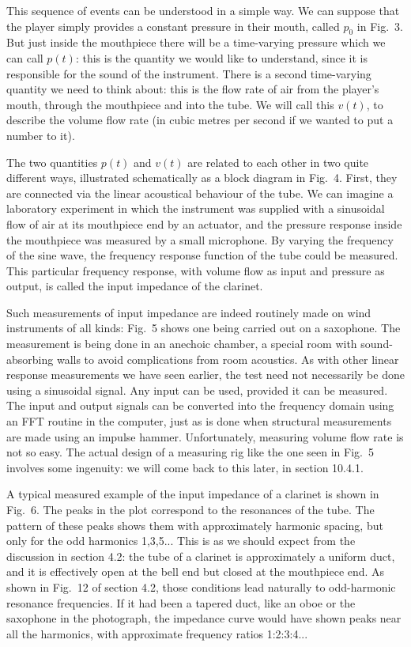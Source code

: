   This sequence of events can be understood in a simple way. We can suppose 
  that the player simply provides a constant pressure in their mouth, called 
  $p_0$ in Fig.\ 3. But just inside the mouthpiece there will be a time-varying 
  pressure which we can call $p(t)$: this is the quantity we would like to 
  understand, since it is responsible for the sound of the instrument. There is 
  a second time-varying quantity we need to think about: this is the flow rate 
  of air from the player’s mouth, through the mouthpiece and into the tube. We 
  will call this $v(t)$, to describe the volume flow rate (in cubic metres per 
  second if we wanted to put a number to it). 

  The two quantities $p(t)$ and $v(t)$ are related to each other in two quite 
  different ways, illustrated schematically as a block diagram in Fig.\ 4. 
  First, they are connected via the linear acoustical behaviour of the tube. We 
  can imagine a laboratory experiment in which the instrument was supplied with 
  a sinusoidal flow of air at its mouthpiece end by an actuator, and the 
  pressure response inside the mouthpiece was measured by a small microphone. 
  By varying the frequency of the sine wave, the frequency response function of 
  the tube could be measured. This particular frequency response, with volume 
  flow as input and pressure as output, is called the input impedance of the 
  clarinet. 

  Such measurements of input impedance are indeed routinely made on wind 
  instruments of all kinds: Fig.\ 5 shows one being carried out on a saxophone. 
  The measurement is being done in an anechoic chamber, a special room with 
  sound-absorbing walls to avoid complications from room acoustics. As with 
  other linear response measurements we have seen earlier, the test need not 
  necessarily be done using a sinusoidal signal. Any input can be used, 
  provided it can be measured. The input and output signals can be converted 
  into the frequency domain using an FFT routine in the computer, just as is 
  done when structural measurements are made using an impulse hammer. 
  Unfortunately, measuring volume flow rate is not so easy. The actual design 
  of a measuring rig like the one seen in Fig.\ 5 involves some ingenuity: we 
  will come back to this later, in section 10.4.1. 

  A typical measured example of the input impedance of a clarinet is shown in 
  Fig.\ 6. The peaks in the plot correspond to the resonances of the tube. The 
  pattern of these peaks shows them with approximately harmonic spacing, but 
  only for the odd harmonics 1,3,5... This is as we should expect from the 
  discussion in section 4.2: the tube of a clarinet is approximately a uniform 
  duct, and it is effectively open at the bell end but closed at the mouthpiece 
  end. As shown in Fig.\ 12 of section 4.2, those conditions lead naturally to 
  odd-harmonic resonance frequencies. If it had been a tapered duct, like an 
  oboe or the saxophone in the photograph, the impedance curve would have shown 
  peaks near all the harmonics, with approximate frequency ratios 1:2:3:4... 

